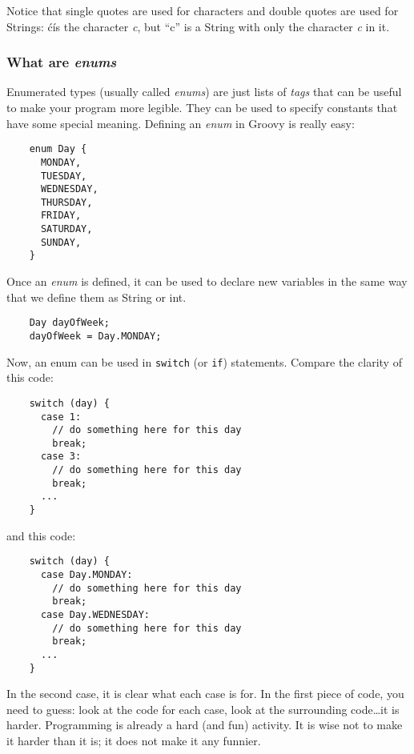 Notice that single quotes are used for characters and double quotes
are used for Strings: \'c\' is the character \emph{c}, but ``c'' is a
String with only the character \emph{c} in it. 

\subsubsection{What are \emph{enums}}
\label{sec:what-types-enum}

Enumerated types (usually called \emph{enums}) 
are just lists of \emph{tags} that can be useful to
make your program more legible. They can be used to specify constants
that have some special meaning. Defining an \emph{enum} in Groovy is
really easy: 

\begin{verbatim}
    enum Day {
      MONDAY,
      TUESDAY,
      WEDNESDAY,
      THURSDAY,
      FRIDAY,
      SATURDAY,
      SUNDAY,
    }
\end{verbatim}

Once an \emph{enum} is defined, it can be used to declare new variables in
the same way that we define them as String or int. 

\begin{verbatim}
    Day dayOfWeek;
    dayOfWeek = Day.MONDAY;
\end{verbatim}

Now, an enum can be used in \texttt{switch} (or \texttt{if})
statements. Compare the clarity of this code:

\begin{verbatim}
    switch (day) {
      case 1: 
        // do something here for this day
        break;
      case 3: 
        // do something here for this day
        break;
      ...
    }
\end{verbatim}

and this code:

\begin{verbatim}
    switch (day) {
      case Day.MONDAY: 
        // do something here for this day
        break;
      case Day.WEDNESDAY: 
        // do something here for this day
        break;
      ...
    }
\end{verbatim}

In the second case, it is clear what each case is for. In the first
piece of code, you need to guess: look at the code for each case, look
at the surrounding code\ldots it is harder. Programming is already a
hard (and fun) activity. It is wise not to make it harder than it is;
it does not make it any funnier. 


